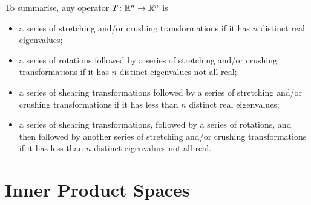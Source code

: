 \documentclass[math, code]{amznotes}
\theoremstyle{remark}
\begin{document}
To summarise, any operator $T \colon \mathbb{R}^n \to \mathbb{R}^n$ is 
\begin{itemize}
    \item a series of stretching and/or crushing transformations if it has $n$ distinct real eigenvalues;
    \item a series of rotations followed by a series of stretching and/or crushing transformations if it has $n$ distinct eigenvalues not all real;
    \item a series of shearing transformations followed by a series of stretching and/or crushing transformations if it has less than $n$ distinct real eigenvalues;
    \item a series of shearing transformations, followed by a series of rotations, and then followed by another series of stretching and/or crushing transformations if it has less than $n$ distinct eigenvalues not all real.
\end{itemize}
\chapter{Inner Product Spaces}
\end{document}
